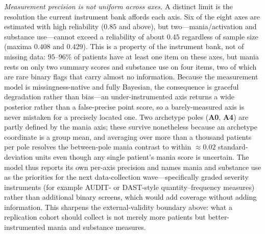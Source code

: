 \emph{Measurement precision is not uniform across axes.} A distinct limit is the
resolution the current instrument bank affords each axis. Six of the eight axes are
estimated with high reliability ($0.85$ and above), but two---mania/activation and
substance use---cannot exceed a reliability of about $0.45$ regardless of sample size
(maxima $0.408$ and $0.429$). This is a property of the instrument bank, not of missing
data: $95$--$96\%$ of patients have at least one item on these axes, but mania rests on
only two summary scores and substance use on four items, two of which are rare binary
flags that carry almost no information. Because the measurement model is missingness-native
and fully Bayesian, the consequence is graceful degradation rather than bias---an
under-instrumented axis returns a wide posterior rather than a false-precise point score,
so a barely-measured axis is never mistaken for a precisely located one. Two archetype
poles (\textbf{A0}, \textbf{A4}) are partly defined by the mania axis; these survive
nonetheless because an archetype coordinate is a group mean, and averaging over more than a
thousand patients per pole resolves the between-pole mania contrast to within $\approx0.02$
standard-deviation units even though any single patient's mania score is uncertain. The
model thus reports its own per-axis precision and names mania and substance use as the
priorities for the next data-collection wave---specifically graded severity instruments
(for example AUDIT- or DAST-style quantity--frequency measures) rather than additional
binary screens, which would add coverage without adding information. This sharpens the
external-validity boundary above: what a replication cohort should collect is not merely
more patients but better-instrumented mania and substance measures.
